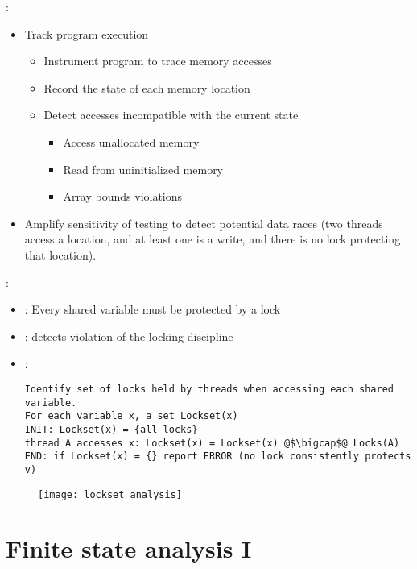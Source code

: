  :
\begin{itemize}
    \item Track program execution
    \begin{itemize}
        \item Instrument program to trace memory accesses
        \item Record the state of each memory location
        \item Detect accesses incompatible with the current state
        \begin{itemize}
            \item Access unallocated memory
            \item Read from uninitialized memory
            \item Array bounds violations
        \end{itemize}
    \end{itemize}
    \item Amplify sensitivity of testing to detect potential data races (two threads access a location, and at least one is a write, and there is no lock protecting that location).
\end{itemize}

 :
\begin{itemize}
    \item {} : Every shared variable must be protected by a lock
    \item {} : detects violation of the locking discipline
    \item {} :
    \begin{lstlisting}[style=pseudoCode, escapeinside=@@]
Identify set of locks held by threads when accessing each shared variable.
For each variable x, a set Lockset(x)
INIT: Lockset(x) = {all locks}
thread A accesses x: Lockset(x) = Lockset(x) @$\bigcap$@ Locks(A)
END: if Lockset(x) = {} report ERROR (no lock consistently protects v)
    \end{lstlisting}
\end{itemize}

\begin{figure}[H]
    \centering
    \texttt{[image: lockset\_analysis]}
\end{figure}

\chapter{Finite state analysis I}

